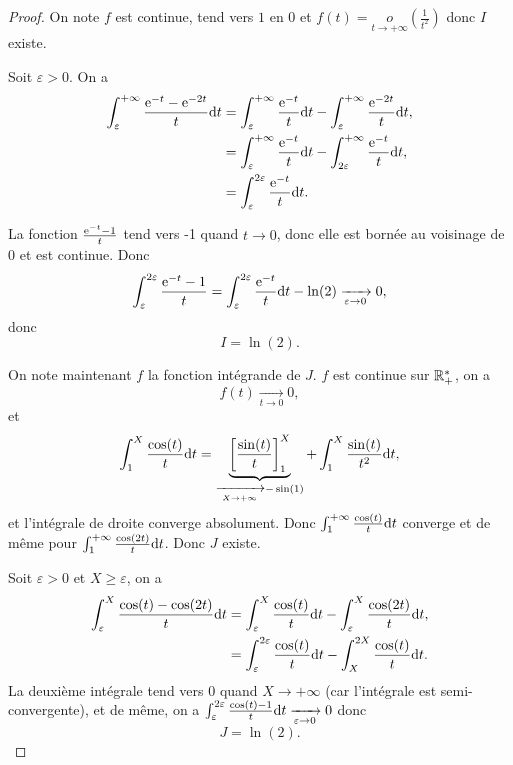 \begin{proof}
    On note 
    $f$ est continue, tend vers $1$ en 0 et $f(t)=\underset{t\to+\infty}{o}\left(\frac{1}{t^{2}}\right)$ donc $I$ existe.

    Soit $\varepsilon>0$. On a 
    \begin{align}
        \int_{\varepsilon}^{+\infty}\frac{\mathrm{e}^{-t}-\mathrm{e}^{-2t}}{t}\mathrm{d} t
        &=\int_{\varepsilon}^{+\infty}\frac{\mathrm{e}^{-t}}{t}\mathrm{d} t-\int_{\varepsilon}^{+\infty}\frac{\mathrm{e}^{-2t}}{t}\mathrm{d} t,\\
        &=\int_{\varepsilon}^{+\infty}\frac{\mathrm{e}^{-t}}{t}\mathrm{d} t-\int_{2\varepsilon}^{+\infty}\frac{\mathrm{e}^{-t}}{t}\mathrm{d} t,\\
        &=\int_{\varepsilon}^{2\varepsilon}\frac{\mathrm{e}^{-t}}{t}\mathrm{d} t.
    \end{align}

    La fonction $\frac{\mathrm{e}^{-t}-1}{t}$ tend vers -1 quand $t\to0$, donc elle est bornée au voisinage de 0 et est continue. Donc 
    \begin{equation}
        \int_{\varepsilon}^{2\varepsilon}\frac{\mathrm{e}^{-t}-1}{t}=\int_{\varepsilon}^{2\varepsilon}\frac{\mathrm{e}^{-t}}{t}\mathrm{d} t-\ln(2)\xrightarrow[\varepsilon\to0]{}0,
    \end{equation}
    donc 
    \begin{equation}
        \boxed{
            I=\ln(2).
        }
    \end{equation}

    On note maintenant $f$ la fonction intégrande de $J$. $f$ est continue sur $\mathbb{R}_{+}^{*}$, on a 
    \begin{equation}
        f(t)\xrightarrow[t\to0]{}0,    
    \end{equation}
    et 
    \begin{equation}
        \int_{1}^{X}\frac{\cos(t)}{t}\mathrm{d} t=\underbrace{\left[\frac{\sin(t)}{t}\right]_{1}^{X}}_{\xrightarrow[X\to+\infty]{}-\sin(1)}+\int_{1}^{X}\frac{\sin(t)}{t^{2}}\mathrm{d} t,
    \end{equation}
    et l'intégrale de droite converge absolument. Donc $\int_{1}^{+\infty}\frac{\cos(t)}{t}\mathrm{d} t$ converge et de même pour $\int_{1}^{+\infty}\frac{\cos(2t)}{t}\mathrm{d} t$. Donc $J$ existe.

    Soit $\varepsilon>0$ et $X\geqslant \varepsilon$, on a 
    \begin{align}
        \int_{\varepsilon}^{X}\frac{\cos(t)-\cos(2t)}{t}\mathrm{d} t
        &=\int_{\varepsilon}^{X}\frac{\cos(t)}{t}\mathrm{d} t-\int_{\varepsilon}^{X}\frac{\cos(2t)}{t}\mathrm{d} t,\\
        &=\int_{\varepsilon}^{2\varepsilon}\frac{\cos(t)}{t}\mathrm{d} t-\int_{X}^{2X}\frac{\cos(t)}{t}\mathrm{d} t.
    \end{align}
    La deuxième intégrale tend vers 0 quand $X\to+\infty$ (car l'intégrale est semi-convergente), et de même, on a $\int_{\varepsilon}^{2\varepsilon}\frac{\cos(t)-1}{t}\mathrm{d} t\xrightarrow[\varepsilon\to0]{}0$ donc 
    \begin{equation}
        \boxed{
            J=\ln(2).
        }
    \end{equation}
\end{proof}

